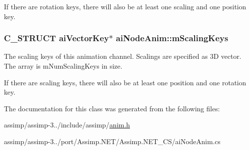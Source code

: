 If there are rotation keys, there will also be at least one scaling and one position key. \hypertarget{structai_node_anim_a4588122722d5148d6e590da820bdf35f}{
\subsubsection[{m\+Scaling\+Keys}]{\setlength{\rightskip}{0pt plus 5cm}C\+\_\+\+S\+T\+R\+U\+C\+T {\bf ai\+Vector\+Key}$\ast$ ai\+Node\+Anim\+::m\+Scaling\+Keys}}\label{structai_node_anim_a4588122722d5148d6e590da820bdf35f}
The scaling keys of this animation channel. Scalings are specified as 3\+D vector. The array is m\+Num\+Scaling\+Keys in size.

If there are scaling keys, there will also be at least one position and one rotation key. 

The documentation for this class was generated from the following files\+:\begin{DoxyCompactItemize}
\item 
assimp/assimp-\/3../include/assimp/\hyperlink{anim_8h}{anim.\+h}\item 
assimp/assimp-\/3../port/\+Assimp.\+N\+E\+T/\+Assimp.\+N\+E\+T\+\_\+\+C\+S/ai\+Node\+Anim.\+cs\end{DoxyCompactItemize}
